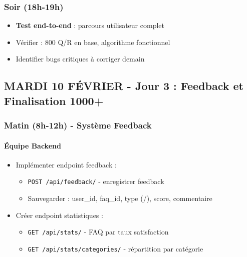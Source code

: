 \documentclass[11pt,a4paper]{article}
\begin{document}
\subsubsection{Soir (18h-19h)}
\begin{itemize}
    \item[$\square$] \textbf{Test end-to-end} : parcours utilisateur complet
    \item[$\square$] Vérifier : 800 Q/R en base, algorithme fonctionnel
    \item[$\square$] Identifier bugs critiques à corriger demain
\end{itemize}

\clearpage

\subsection{MARDI 10 FÉVRIER - Jour 3 : Feedback et Finalisation 1000+}

\subsubsection{Matin (8h-12h) - Système Feedback}

\paragraph{Équipe Backend}
\begin{itemize}
    \item[$\square$] Implémenter endpoint feedback :
    \begin{itemize}
        \item \texttt{POST /api/feedback/} - enregistrer feedback
        \item Sauvegarder : user\_id, faq\_id, type (\faThumbsUp/\faThumbsDown), score, commentaire
    \end{itemize}
    \item[$\square$] Créer endpoint statistiques :
    \begin{itemize}
        \item \texttt{GET /api/stats/} - FAQ par taux satisfaction
        \item \texttt{GET /api/stats/categories/} - répartition par catégorie
    \end{itemize}
\end{itemize}
\end{document}
